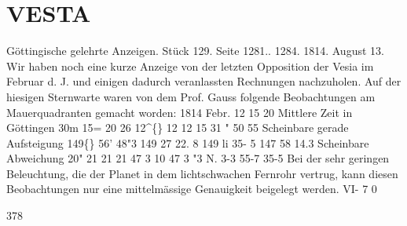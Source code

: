 \documentclass[12pt,a4paper]{article}
\newcommand{\degree}{\textdegree}
\begin{document}
\section*{VESTA}
Göttingische  gelehrte  Anzeigen.     Stück  129.  Seite  1281..  1284.     1814.  August  13. 
Wir  haben  noch  eine  kurze  Anzeige  von  der  letzten  Opposition  der  Vesia  im  Februar  d.  J.  und 
einigen  dadurch  veranlassten  Rechnungen  nachzuholen.  Auf  der  hiesigen  Sternwarte  waren  von  dem 
Prof.  Gauss  folgende  Beobachtungen  am  Mauerquadranten  gemacht  worden: 
1814 
Febr.   12 
15 
20 
Mittlere  Zeit 
in  Göttingen 
30m  15= 
20    26 
12\textasciicircum\{\} 
12 
12     15     31 
"     50     55 
Scheinbare  gerade 
Aufsteigung 
149\degree\{\}  56'  48"3 
149     27  22. 8 
149     li  35-  5 
147     58  14.3 
Scheinbare 
Abweichung 
20" 
21 
21 
21 
47 
3 
10 
47 
3  "3  N. 
3-3 
55-7 
35-5 
Bei  der  sehr  geringen  Beleuchtung,  die  der  Planet  in  dem  lichtschwachen  Fernrohr  vertrug,  kann 
diesen  Beobachtungen  nur  eine  mittelmässige  Genauigkeit  beigelegt  werden. 
VI-  7  0 


\newpage
378 
\end{document}
